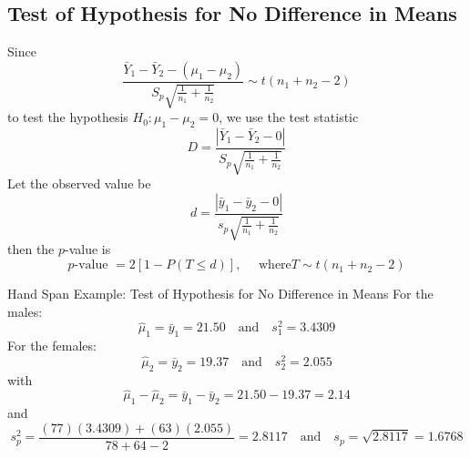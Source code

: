 \documentclass[oneside]{book}
\begin{document}
\subsection{Test of Hypothesis for No Difference in Means}
Since
\[\frac{\bar{Y}_{1}-\bar{Y}_{2}-\left(\mu_{1}-\mu_{2}\right)}{S_{p} \sqrt{\frac{1}{n_{1}}+\frac{1}{n_{2}}}} \sim t\left(n_{1}+n_{2}-2\right)\]
to test the hypothesis $ H_0:\mu_1-\mu_2=0 $,
we use the test statistic
\[D=\frac{\left|\bar{Y}_{1}-\bar{Y}_{2}-0\right|}{S_{p} \sqrt{\frac{1}{n_{1}}+\frac{1}{n_{2}}}}\]
Let the observed value be
\[d=\frac{\left|\bar{y}_{1}-\bar{y}_{2}-0\right|}{s_{p} \sqrt{\frac{1}{n_{1}}+\frac{1}{n_{2}}}}\]
then the $ p $-value is
\[p \text{-value }=2[1-P(T \leq d)], \quad \text{ where} T \sim t\left(n_{1}+n_{2}-2\right)\]

\begin{Example}{Hand Span Example: Test of Hypothesis for No Difference in Means}{}
    For the males:
    \[\hat{\mu}_{1}=\bar{y}_{1}=21.50 \quad \text{and} \quad s_{1}^{2}=3.4309\]
    For the females:
    \[\hat{\mu}_{2}=\bar{y}_{2}=19.37 \quad \text{and} \quad s_{2}^{2}=2.055\]
    with
    \[\hat{\mu}_{1}-\hat{\mu}_{2}=\bar{y}_{1}-\bar{y}_{2}=21.50-19.37=2.14\]
    and
    \[s_{p}^{2}=\frac{(77)(3.4309)+(63)(2.055)}{78+64-2}=2.8117 \quad \text{and} \quad s_{p}=\sqrt{2.8117}=1.6768\]

\end{Example}
\end{document}
